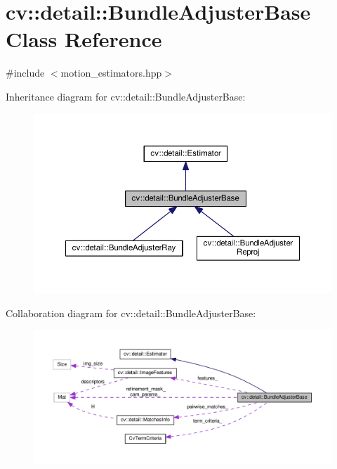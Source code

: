 \hypertarget{classcv_1_1detail_1_1BundleAdjusterBase}{\section{cv\-:\-:detail\-:\-:Bundle\-Adjuster\-Base Class Reference}
\label{classcv_1_1detail_1_1BundleAdjusterBase}
}


{\ttfamily \#include $<$motion\-\_\-estimators.\-hpp$>$}



Inheritance diagram for cv\-:\-:detail\-:\-:Bundle\-Adjuster\-Base\-:\nopagebreak
\begin{figure}[H]
\begin{center}
\leavevmode
\includegraphics[width=350pt]{classcv_1_1detail_1_1BundleAdjusterBase__inherit__graph}
\end{center}
\end{figure}


Collaboration diagram for cv\-:\-:detail\-:\-:Bundle\-Adjuster\-Base\-:\nopagebreak
\begin{figure}[H]
\begin{center}
\leavevmode
\includegraphics[width=350pt]{classcv_1_1detail_1_1BundleAdjusterBase__coll__graph}
\end{center}
\end{figure}
